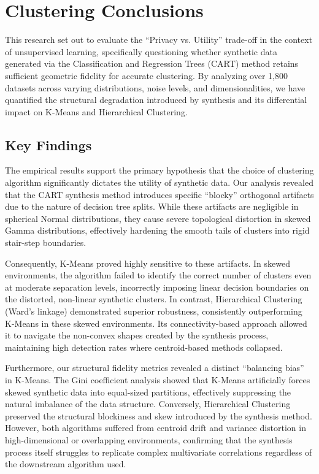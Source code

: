 \chapter{Clustering Conclusions}
\label{chap:conclusions}

This research set out to evaluate the ``Privacy vs. Utility'' trade-off in the context of unsupervised learning, specifically questioning whether synthetic data generated via the Classification and Regression Trees (CART) method retains sufficient geometric fidelity for accurate clustering. By analyzing over 1,800 datasets across varying distributions, noise levels, and dimensionalities, we have quantified the structural degradation introduced by synthesis and its differential impact on K-Means and Hierarchical Clustering.

\section{Key Findings}
\label{sec:key-findings}

The empirical results support the primary hypothesis that the choice of clustering algorithm significantly dictates the utility of synthetic data. Our analysis revealed that the CART synthesis method introduces specific ``blocky'' orthogonal artifacts due to the nature of decision tree splits. While these artifacts are negligible in spherical Normal distributions, they cause severe topological distortion in skewed Gamma distributions, effectively hardening the smooth tails of clusters into rigid stair-step boundaries.

Consequently, K-Means proved highly sensitive to these artifacts. In skewed environments, the algorithm failed to identify the correct number of clusters even at moderate separation levels, incorrectly imposing linear decision boundaries on the distorted, non-linear synthetic clusters. In contrast, Hierarchical Clustering (Ward's linkage) demonstrated superior robustness, consistently outperforming K-Means in these skewed environments. Its connectivity-based approach allowed it to navigate the non-convex shapes created by the synthesis process, maintaining high detection rates where centroid-based methods collapsed.

Furthermore, our structural fidelity metrics revealed a distinct ``balancing bias'' in K-Means. The Gini coefficient analysis showed that K-Means artificially forces skewed synthetic data into equal-sized partitions, effectively suppressing the natural imbalance of the data structure. Conversely, Hierarchical Clustering preserved the structural blockiness and skew introduced by the synthesis method. However, both algorithms suffered from centroid drift and variance distortion in high-dimensional or overlapping environments, confirming that the synthesis process itself struggles to replicate complex multivariate correlations regardless of the downstream algorithm used.

